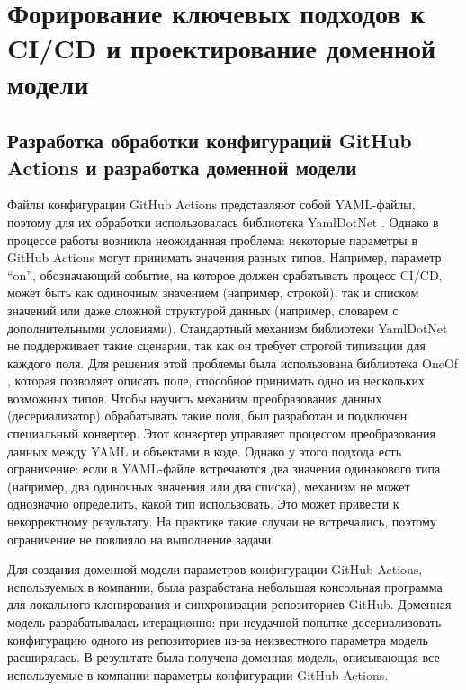\chapter{Форирование ключевых подходов к CI/CD и проектирование доменной модели} \label{ch:ch2}

\section{Разработка обработки конфигураций GitHub Actions и разработка доменной модели} \label{sec:domain-model-investigation}
Файлы конфигурации GitHub Actions представляют собой YAML-файлы, поэтому для их обработки использовалась библиотека YamlDotNet \cite{yamldotnet}.
Однако в процессе работы возникла неожиданная проблема: некоторые параметры в GitHub Actions могут принимать значения разных типов.
Например, параметр \enquote{on}, обозначающий событие, на которое должен срабатывать процесс CI/CD, может быть как одиночным значением (например, строкой), так и списком значений или даже сложной структурой данных (например, словарем с дополнительными условиями).
Стандартный механизм библиотеки YamlDotNet не поддерживает такие сценарии,
так как он требует строгой типизации для каждого поля.
Для решения этой проблемы была использована библиотека OneOf \cite{oneof},
которая позволяет описать поле, способное принимать одно из нескольких возможных типов.
Чтобы научить механизм преобразования данных (десериализатор) обрабатывать такие поля, был разработан и подключен специальный конвертер.
Этот конвертер управляет процессом преобразования данных между YAML и объектами в коде.
Однако у этого подхода есть ограничение: если в YAML-файле встречаются два значения одинакового типа (например, два одиночных значения или два списка),
механизм не может однозначно определить, какой тип использовать.
Это может привести к некорректному результату.
На практике такие случаи не встречались, поэтому ограничение не повлияло на выполнение задачи.

Для создания доменной модели параметров конфигурации GitHub Actions, используемых в компании, была разработана небольшая консольная программа для локального клонирования и синхронизации репозиториев GitHub.
Доменная модель разрабатывалась итерационно: при неудачной попытке десериализовать конфигурацию одного из репозиториев из-за неизвестного параметра модель расширялась.
В результате была получена доменная модель, описывающая все используемые в компании параметры конфигурации GitHub Actions.

